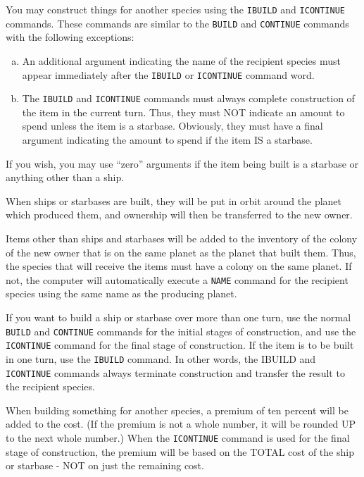 \documentclass[10pt,titlepage]{article}
\begin{document}
You may construct things for another species using the \texttt{IBUILD} and \texttt{ICONTINUE}
commands.  These commands are similar to the \texttt{BUILD} and \texttt{CONTINUE} commands with
the following exceptions:
\begin{enumerate}[a.]
 \item An additional argument indicating the name of the recipient
	species must appear immediately after the \texttt{IBUILD} or \texttt{ICONTINUE}
	command word.

	\item The \texttt{IBUILD} and \texttt{ICONTINUE} commands must always complete
	construction of the item in the current turn.  Thus, they must
	NOT indicate an amount to spend unless the item is a starbase.
	Obviously, they must have a final argument indicating the amount
	to spend if the item IS a starbase.
\end{enumerate}
If you wish, you may use ``zero'' arguments if the item being built is a starbase
or anything other than a ship.

When ships or starbases are built, they will be put in orbit around the planet
which produced them, and ownership will then be transferred to the new owner.

Items other than ships and starbases will be added to the inventory of the
colony of the new owner that is on the same planet as the planet that built
them.  Thus, the species that will receive the items must have a colony on the
same planet.  If not, the computer will automatically execute a \texttt{NAME} command
for the recipient species using the same name as the producing planet.

If you want to build a ship or starbase over more than one turn, use the normal
\texttt{BUILD} and \texttt{CONTINUE} commands for the initial stages of construction, and use the
\texttt{ICONTINUE} command for the final stage of construction.  If the item is to be
built in one turn, use the \texttt{IBUILD} command.  In other words, the IBUILD and
\texttt{ICONTINUE} commands always terminate construction and transfer the result to
the recipient species.

When building something for another species, a premium of ten percent will be
added to the cost.  (If the premium is not a whole number, it will be rounded
UP to the next whole number.)  When the \texttt{ICONTINUE} command is used for the final
stage of construction, the premium will be based on the TOTAL cost of the ship
or starbase - NOT on just the remaining cost.
\end{document}
